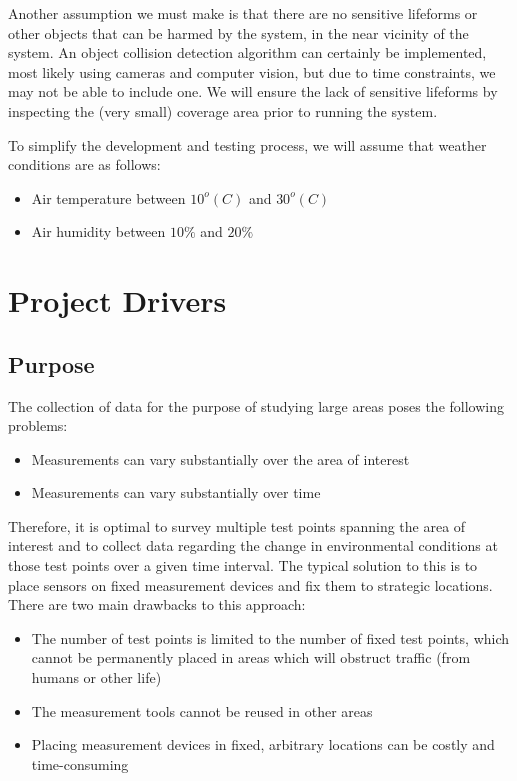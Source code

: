 \documentclass[11pt]{article}
\begin{document}
Another assumption we must make is that there are no sensitive lifeforms or other objects that can be harmed by the system, in the near vicinity of the system. An object collision detection algorithm can certainly be implemented, most likely using cameras and computer vision, but due to time constraints, we may not be able to include one. We will ensure the lack of sensitive lifeforms by inspecting the
(very small) coverage area prior to running the system.

To simplify the development and testing process, we will assume that weather conditions are as follows:

\begin{itemize}
    \item Air temperature between $10^o (C)$ and $30^o (C)$
    \item Air humidity between $10\%$ and $20\%$
\end{itemize}

\section{Project Drivers}
\subsection{Purpose}
The collection of data for the purpose of studying large areas poses the following problems: 
\begin{itemize}
    \item Measurements can vary substantially over the area of interest
    \item Measurements can vary substantially over time
\end{itemize}

Therefore, it is optimal to survey multiple test points spanning the area of interest and to collect data regarding the change in environmental conditions at those test points over a given time interval. The typical solution to this is to place sensors on fixed measurement devices and fix them to strategic locations. There are two main drawbacks to this approach:
\begin{itemize}
    \item The number of test points is limited to the number of fixed test points, which cannot be permanently placed in areas which will obstruct traffic (from humans or other life)
    \item The measurement tools cannot be reused in other areas
    \item Placing measurement devices in fixed, arbitrary locations can be costly and time-consuming
\end{itemize}
\end{document}
